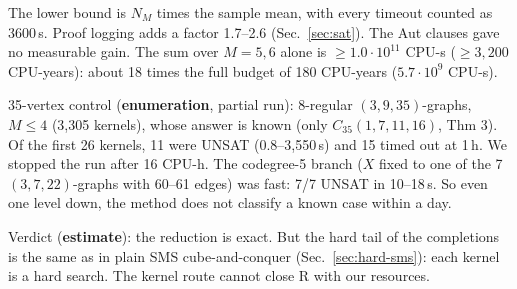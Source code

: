 The lower bound is $N_M$ times the sample mean, with every timeout counted as 3600\,s. Proof logging adds a factor 1.7--2.6 (Sec.~\ref{sec:sat}). The Aut clauses gave no
measurable gain. The sum over $M = 5, 6$ alone is $\ge 1.0\cdot 10^{11}$ CPU-s ($\ge 3{,}200$ CPU-years): about 18 times the full
budget of 180 CPU-years ($5.7\cdot 10^{9}$ CPU-s).

35-vertex control (\textbf{enumeration}, partial run): 8-regular $(3,9,35)$-graphs, $M \le 4$ (3,305 kernels), whose answer is
known (only $C_{35}(1,7,11,16)$, \cite{GR} Thm 3). Of the first 26 kernels, 11 were UNSAT (0.8--3,550\,s) and 15 timed out at
1\,h. We stopped the run after 16 CPU-h. The codegree-5 branch ($X$ fixed to one of the 7 $(3,7,22)$-graphs with 60--61 edges)
was fast: 7/7 UNSAT in 10--18\,s. So even one level down, the method does not classify a known case within a day.

Verdict (\textbf{estimate}): the reduction is exact. But the hard tail of the completions is the same as in plain SMS
cube-and-conquer (Sec.~\ref{sec:hard-sms}): each kernel is a hard search. The kernel route cannot close R with our resources.

